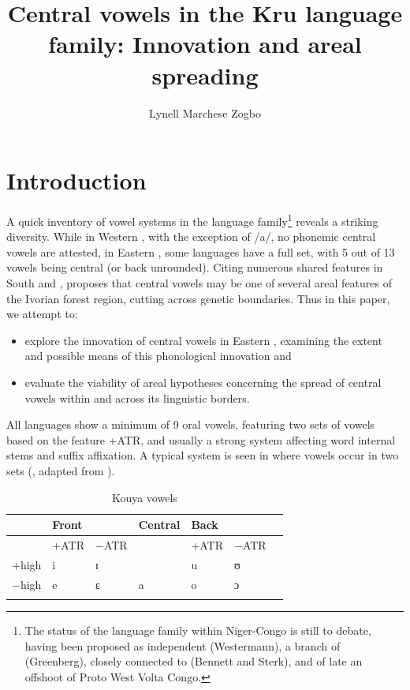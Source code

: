 \documentclass[output=paper,newtxmath,modfonts,nonflat,draft]{langsci/langscibook}
\title{Central vowels in the Kru language family: Innovation and areal spreading}
\author{Lynell Marchese Zogbo\affiliation{University of the Free State; Institut de Linguistique Appliquée, Abidjan}}
\begin{document}
\maketitle 
\section{Introduction}\label{sec:zogbo:1} 

A quick inventory of vowel systems in the  language family\footnote{The status of the  language family within Niger-Congo is still  to debate, having been proposed as independent (Westermann), a branch of  (Greenberg), closely connected to  (Bennett and Sterk), and of late \citep[18]{Williamson2000} an offshoot of Proto West Volta Congo.} reveals a striking diversity.  While in Western , with the exception of /a/, no phonemic central vowels are attested, in Eastern , some languages have a full set, with 5 out of 13 vowels being central (or back unrounded). Citing numerous shared features in South  and , \citet{Vydrine2009} proposes that central vowels may be one of several areal features of the Ivorian forest region, cutting across genetic boundaries.  Thus in this paper, we attempt to:

\begin{itemize}
\item explore the innovation of central vowels in Eastern , examining the extent and possible means of this phonological innovation and \\[-0.75cm]
\item evaluate the viability of areal hypotheses concerning the spread of central vowels within  and across its linguistic borders. 
\end{itemize}

All  languages show a minimum of 9 oral vowels, featuring two sets of vowels based on the feature +ATR, and usually a strong  system affecting word internal stems and suffix affixation. A typical system is seen in  where vowels occur in two sets (, adapted from \citealt[50]{Saunders2009}).

\begin{table}[h]
\begin{tabular}{lllllll}
\lsptoprule
& Front   &&   Central &   Back &\\
\midrule
& +ATR & −ATR   &   &  +ATR & −ATR\\

+high  &  i &	ɪ    &&   u  &  ʊ\\

−high  &  e & ɛ  &  a  &  o & ɔ\\
\lspbottomrule
\end{tabular}  
\caption{Kouya vowels}
\label{tab:zogbo:1}
\end{table}
\end{document}
